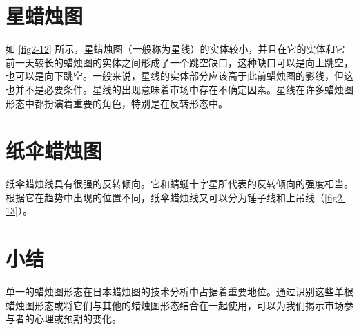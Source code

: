 \section{星蜡烛图}
如 \autoref{fig2-12} 所示，星蜡烛图（一般称为星线）的实体较小，并且在它的实体和它前一天较长的蜡烛图的实体之间形成了一个跳空缺口，这种缺口可以是向上跳空，也可以是向下跳空。一般来说，星线的实体部分应该高于此前蜡烛图的影线，但这也并不是必要条件。星线的出现意味着市场中存在不确定因素。星线在许多蜡烛图形态中都扮演着重要的角色，特别是在反转形态中。
\section{纸伞蜡烛图}
纸伞蜡烛线具有很强的反转倾向。它和蜻蜓十字星所代表的反转倾向的强度相当。根据它在趋势中出现的位置不同，纸伞蜡烛线又可以分为锤子线和上吊线（\autoref{fig2-13}）。
\section{小结}
单一的蜡烛图形态在日本蜡烛图的技术分析中占据着重要地位。通过识别这些单根蜡烛图形态或将它们与其他的蜡烛图形态结合在一起使用，可以为我们揭示市场参与者的心理或预期的变化。